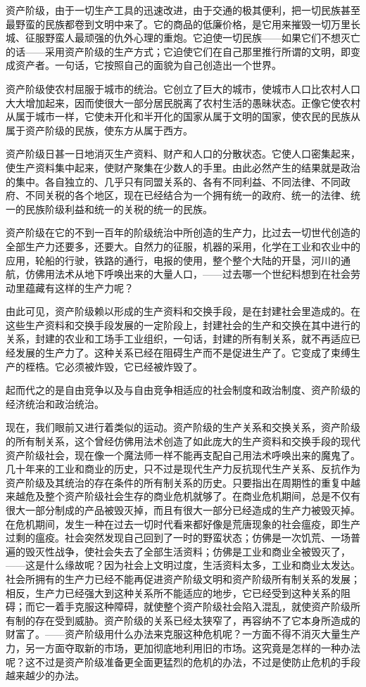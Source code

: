 \documentclass[10pt, UTF8]{book} %
\begin{document}
资产阶级，由于一切生产工具的迅速改进，由于交通的极其便利，把一切民族甚至最野蛮的民族都卷到文明中来了。它的商品的低廉价格，是它用来摧毁一切万里长城、征服野蛮人最顽强的仇外心理的重炮。它迫使一切民族——如果它们不想灭亡的话——采用资产阶级的生产方式；它迫使它们在自己那里推行所谓的文明，即变成资产者。一句话，它按照自己的面貌为自己创造出一个世界。

资产阶级使农村屈服于城市的统治。它创立了巨大的城市，使城市人口比农村人口大大增加起来，因而使很大一部分居民脱离了农村生活的愚昧状态。正像它使农村从属于城市一样，它使未开化和半开化的国家从属于文明的国家，使农民的民族从属于资产阶级的民族，使东方从属于西方。

资产阶级日甚一日地消灭生产资料、财产和人口的分散状态。它使人口密集起来，使生产资料集中起来，使财产聚集在少数人的手里。由此必然产生的结果就是政治的集中。各自独立的、几乎只有同盟关系的、各有不同利益、不同法律、不同政府、不同关税的各个地区，现在已经结合为一个拥有统一的政府、统一的法律、统一的民族阶级利益和统一的关税的统一的民族。

资产阶级在它的不到一百年的阶级统治中所创造的生产力，比过去一切世代创造的全部生产力还要多，还要大。自然力的征服，机器的采用，化学在工业和农业中的应用，轮船的行驶，铁路的通行，电报的使用，整个整个大陆的开垦，河川的通航，仿佛用法术从地下呼唤出来的大量人口，——过去哪一个世纪料想到在社会劳动里蕴藏有这样的生产力呢？

由此可见，资产阶级赖以形成的生产资料和交换手段，是在封建社会里造成的。在这些生产资料和交换手段发展的一定阶段上，封建社会的生产和交换在其中进行的关系，封建的农业和工场手工业组织，一句话，封建的所有制关系，就不再适应已经发展的生产力了。这种关系已经在阻碍生产而不是促进生产了。它变成了束缚生产的桎梏。它必须被炸毁，它已经被炸毁了。

起而代之的是自由竞争以及与自由竞争相适应的社会制度和政治制度、资产阶级的经济统治和政治统治。

现在，我们眼前又进行着类似的运动。资产阶级的生产关系和交换关系，资产阶级的所有制关系，这个曾经仿佛用法术创造了如此庞大的生产资料和交换手段的现代资产阶级社会，现在像一个魔法师一样不能再支配自己用法术呼唤出来的魔鬼了。几十年来的工业和商业的历史，只不过是现代生产力反抗现代生产关系、反抗作为资产阶级及其统治的存在条件的所有制关系的历史。只要指出在周期性的重复中越来越危及整个资产阶级社会生存的商业危机就够了。在商业危机期间，总是不仅有很大一部分制成的产品被毁灭掉，而且有很大一部分已经造成的生产力被毁灭掉。在危机期间，发生一种在过去一切时代看来都好像是荒唐现象的社会瘟疫，即生产过剩的瘟疫。社会突然发现自己回到了一时的野蛮状态；仿佛是一次饥荒、一场普遍的毁灭性战争，使社会失去了全部生活资料；仿佛是工业和商业全被毁灭了，——这是什么缘故呢？因为社会上文明过度，生活资料太多，工业和商业太发达。社会所拥有的生产力已经不能再促进资产阶级文明和资产阶级所有制关系的发展；相反，生产力已经强大到这种关系所不能适应的地步，它已经受到这种关系的阻碍；而它一着手克服这种障碍，就使整个资产阶级社会陷入混乱，就使资产阶级所有制的存在受到威胁。资产阶级的关系已经太狭窄了，再容纳不了它本身所造成的财富了。——资产阶级用什么办法来克服这种危机呢？一方面不得不消灭大量生产力，另一方面夺取新的市场，更加彻底地利用旧的市场。这究竟是怎样的一种办法呢？这不过是资产阶级准备更全面更猛烈的危机的办法，不过是使防止危机的手段越来越少的办法。
\end{document}
